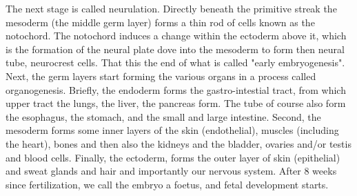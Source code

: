 The next stage is called neurulation.
Directly beneath the primitive streak the mesoderm (the middle germ layer) forms a thin rod of cells known as the notochord.
The notochord induces a change within the ectoderm above it, which is the formation of the neural plate dove into the mesoderm to form then neural tube, neurocrest cells.
That this the end of what is called "early embryogenesis".\\


Next, the germ layers start forming the various organs in a process called organogenesis.
Briefly, the endoderm forms the gastro-intestial tract, from which upper tract the lungs, the liver, the pancreas form. 
The tube of course also form the esophagus, the stomach, and the small and large intestine.
Second, the mesoderm forms some inner layers of the skin (endothelial), muscles (including the heart), bones and then also the kidneys and the bladder, ovaries and/or testis and blood cells.
Finally, the ectoderm, forms the outer layer of skin (epithelial) and sweat glands and hair and importantly our nervous system.
After 8 weeks since fertilization, we call the embryo a foetus, and fetal development starts.









